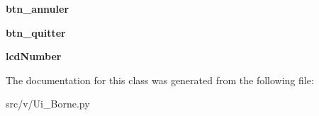 \begin{DoxyCompactItemize}
\item 
\hypertarget{classsrc_1_1v_1_1_ui___borne_1_1_ui___borne_a09be4307c42874628c47c7846b9672f6}{}{\bfseries btn\+\_\+annuler}\label{classsrc_1_1v_1_1_ui___borne_1_1_ui___borne_a09be4307c42874628c47c7846b9672f6}

\item 
\hypertarget{classsrc_1_1v_1_1_ui___borne_1_1_ui___borne_aab19537d5f8a3a0a0f46d6dc1bb40e6c}{}{\bfseries btn\+\_\+quitter}\label{classsrc_1_1v_1_1_ui___borne_1_1_ui___borne_aab19537d5f8a3a0a0f46d6dc1bb40e6c}

\item 
\hypertarget{classsrc_1_1v_1_1_ui___borne_1_1_ui___borne_a96e7b7227ca3d1d590cb16de6cc10f10}{}{\bfseries lcd\+Number}\label{classsrc_1_1v_1_1_ui___borne_1_1_ui___borne_a96e7b7227ca3d1d590cb16de6cc10f10}

\end{DoxyCompactItemize}


The documentation for this class was generated from the following file\+:\begin{DoxyCompactItemize}
\item 
src/v/Ui\+\_\+\+Borne.\+py\end{DoxyCompactItemize}

